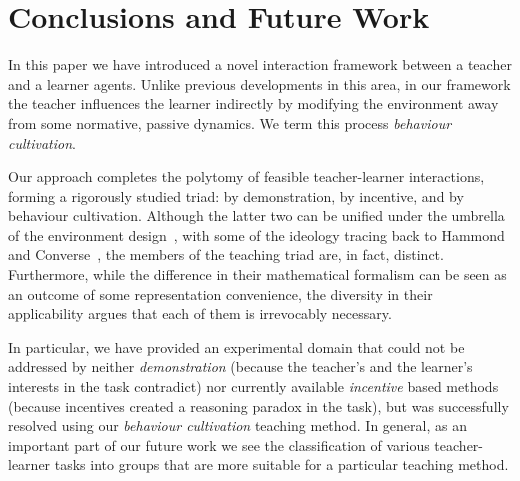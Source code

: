 \section{Conclusions and Future Work}\label{sec: future work}

In this paper we have introduced a novel interaction framework between
a teacher and a learner agents. Unlike previous developments in this
area, in our framework the teacher influences the learner indirectly by
modifying the environment away from some normative, passive
dynamics. We term this process {\em behaviour cultivation}.

Our approach completes the polytomy of feasible teacher-learner
interactions, forming a rigorously studied triad: by demonstration, by
incentive, and by behaviour cultivation. Although the latter two can
be unified under the umbrella of the environment
design~\cite{Zhang09:General}, with some of the ideology tracing back
to Hammond and Converse~\cite{hammond_converse_91}, the members of the
teaching triad are, in fact, distinct. Furthermore, while the
difference in their mathematical formalism can be seen as an outcome
of some representation convenience, the diversity in their
applicability argues that each of them is irrevocably necessary.


In particular, we have provided an experimental domain that could not
be addressed by neither {\em demonstration} (because the teacher's and
the learner's interests in the task contradict) nor currently
available {\em incentive} based methods (because incentives created a
reasoning paradox in the task), but was successfully resolved using
our {\em behaviour cultivation} teaching method. In general, as an
important part of our future work we see the classification of various
teacher-learner tasks into groups that are more suitable for a
particular teaching method.


